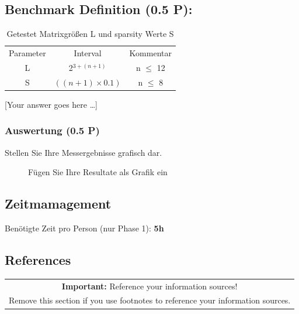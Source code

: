 \documentclass[11pt]{scrartcl}
\newcommand{\youranswerhere}{[Your answer goes here \ldots]}
\begin{document}
\subsection*{Benchmark Definition (0.5 P):}

\begin{table}[h]
	\centering
		\begin{center}
			\begin{tabular}{ c c c }
				Parameter & Interval & Kommentar\\
				L & 2$^{3 + (n + 1)}$ & n $\leq$ 12 \\ 
				S & $((n + 1) \times 0.1)$ & n $\leq$ 8 \\  
			\end{tabular}
			\end{center}
	\caption{Getestet Matrixgrößen L und sparsity Werte S}
	\label{tab:MatrixgrößenLUndSparsityWerteS}
\end{table}

\youranswerhere{}

\subsubsection*{Auswertung (0.5 P)}

Stellen Sie Ihre Messergebnisse grafisch dar. 

\begin{figure}
	\centering

	\caption{Fügen Sie Ihre Resultate als Grafik ein}
	\label{fig:results}
\end{figure}


\subsection*{Zeitmamagement}

Benötigte Zeit pro Person (nur Phase 1): \textbf{5h}

\subsection*{References}

\begin{table}[H]
  \centering
  \begin{tabular}{c}
    \hline
    \textbf{Important:} Reference your information sources! \tabularnewline
    Remove this section if you use footnotes to reference your information sources. \tabularnewline
    \hline
  \end{tabular}
\end{table}
\end{document}
